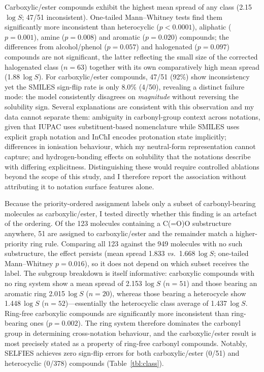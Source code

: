 \documentclass[twoside,twocolumn,9pt]{article}
\newcommand{\logS}{\ensuremath{\log S}}
\begin{document}
Carboxylic/ester compounds exhibit the highest mean spread of any class (2.15\,$\logS$; 47/51 inconsistent). One-tailed Mann--Whitney tests find them significantly more inconsistent than heterocyclic ($p<0.0001$), aliphatic ($p=0.001$), amine ($p=0.008$) and aromatic ($p=0.020$) compounds; the differences from alcohol/phenol ($p=0.057$) and halogenated ($p=0.097$) compounds are not significant, the latter reflecting the small size of the corrected halogenated class ($n=63$) together with its own comparatively high mean spread (1.88\,$\logS$). For carboxylic/ester compounds, 47/51 (92\%) show inconsistency yet the SMILES sign-flip rate is only 8.0\% (4/50), revealing a distinct failure mode: the model consistently disagrees on \textit{magnitude} without reversing the solubility sign. Several explanations are consistent with this observation and my data cannot separate them: ambiguity in carbonyl-group context across notations, given that IUPAC uses substituent-based nomenclature while SMILES uses explicit graph notation and InChI encodes protonation state implicitly; differences in ionisation behaviour, which my neutral-form representation cannot capture; and hydrogen-bonding effects on solubility that the notations describe with differing explicitness. Distinguishing these would require controlled ablations beyond the scope of this study, and I therefore report the association without attributing it to notation surface features alone.

Because the priority-ordered assignment labels only a subset of carbonyl-bearing molecules as carboxylic/ester, I tested directly whether this finding is an artefact of the ordering. Of the 123 molecules containing a C(=O)O substructure anywhere, 51 are assigned to carboxylic/ester and the remainder match a higher-priority ring rule. Comparing all 123 against the 949 molecules with no such substructure, the effect persists (mean spread 1.833 \textit{vs.}\ 1.668\,$\logS$; one-tailed Mann--Whitney $p=0.016$), so it does not depend on which subset receives the label. The subgroup breakdown is itself informative: carboxylic compounds with no ring system show a mean spread of 2.153\,$\logS$ ($n=51$) and those bearing an aromatic ring 2.015\,$\logS$ ($n=20$), whereas those bearing a heterocycle show 1.448\,$\logS$ ($n=52$)---essentially the heterocyclic class average of 1.437\,$\logS$. Ring-free carboxylic compounds are significantly more inconsistent than ring-bearing ones ($p=0.002$). The ring system therefore dominates the carbonyl group in determining cross-notation behaviour, and the carboxylic/ester result is most precisely stated as a property of ring-free carbonyl compounds. Notably, SELFIES achieves zero sign-flip errors for both carboxylic/ester (0/51) and heterocyclic (0/378) compounds (Table~\ref{tbl:class}).
\end{document}
